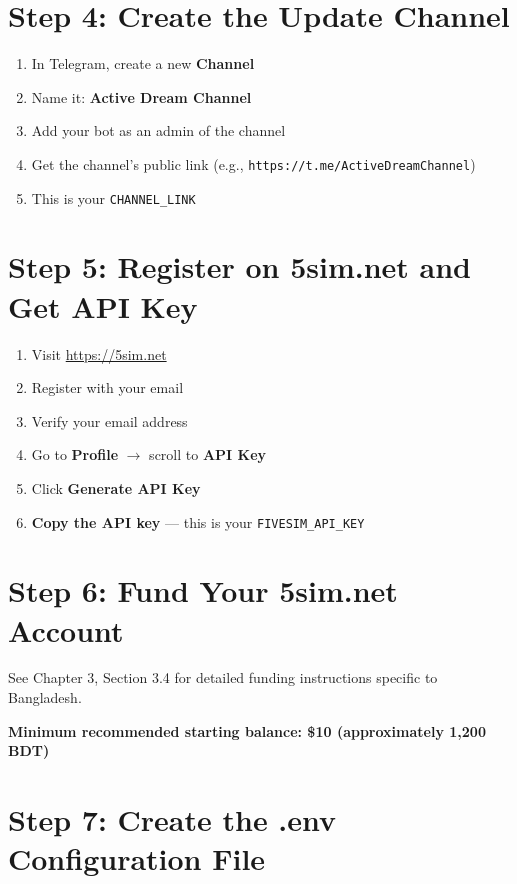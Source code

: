 \section{Step 4: Create the Update Channel}

\begin{enumerate}
    \item In Telegram, create a new \textbf{Channel}
    \item Name it: \textbf{Active Dream Channel}
    \item Add your bot as an admin of the channel
    \item Get the channel's public link (e.g., \texttt{https://t.me/ActiveDreamChannel})
    \item This is your \texttt{CHANNEL\_LINK}
\end{enumerate}

\section{Step 5: Register on 5sim.net and Get API Key}

\begin{enumerate}
    \item Visit \href{https://5sim.net}{https://5sim.net}
    \item Register with your email
    \item Verify your email address
    \item Go to \textbf{Profile} $\rightarrow$ scroll to \textbf{API Key}
    \item Click \textbf{Generate API Key}
    \item \textbf{Copy the API key} --- this is your \texttt{FIVESIM\_API\_KEY}
\end{enumerate}

\section{Step 6: Fund Your 5sim.net Account}

See Chapter 3, Section 3.4 for detailed funding instructions specific to Bangladesh.

\textbf{Minimum recommended starting balance: \$10 (approximately 1,200 BDT)}

\section{Step 7: Create the .env Configuration File}

